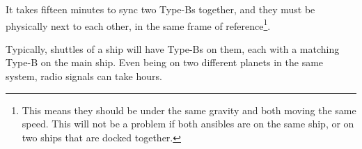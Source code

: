 \par
It takes fifteen minutes to sync two Type-Bs together, and they must be physically next to each other, in the same frame of reference\footnote{This means they should be under the same gravity and both moving the same speed. This will not be a problem if both ansibles are on the same ship, or on two ships that are docked together.}.

\par
Typically, shuttles of a ship will have Type-Bs on them, each with a matching Type-B on the main ship. Even being on two different planets in the same system, radio signals can take hours.